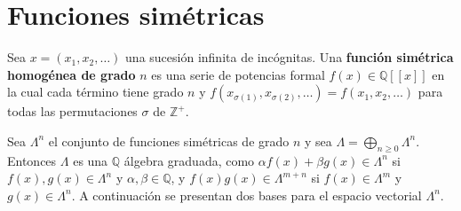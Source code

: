 \documentclass[12pt]{book}
\theoremstyle{definition}
\newcounter{in}
\newcounter{ini}
\begin{document}
\section{Funciones simétricas}
\label{sim_fun}

Sea $x = (x_1, x_2, \ldots)$ una sucesión infinita de incógnitas. Una
\textbf{función simétrica homogénea de grado} $n$ es una serie de
potencias formal
$f(x) \in \mathbb{Q}\left [ \left [ x \right ] \right ]$ en la cual
cada término tiene grado $n$ y
$f(x_{\sigma(1)},x_{\sigma(2)}, \ldots) = f(x_1, x_2, \ldots)$ para
todas las permutaciones $\sigma$ de $\mathbb{Z}^{+}$.

Sea $\Lambda^{n}$ el conjunto de funciones simétricas de grado $n$ y
sea $\Lambda = \bigoplus_{n \geq 0} \Lambda^{n}$. Entonces $\Lambda$
es una $\mathbb{Q}$ álgebra graduada, como
$\alpha f(x) + \beta g(x) \in \Lambda^{n}$ si
$f(x), g(x) \in \Lambda^{n}$ y $\alpha, \beta \in \mathbb{Q}$, y
$f(x)g(x) \in \Lambda^{m+n}$ si $f(x) \in \Lambda^{m}$ y
$g(x) \in \Lambda^{n}$.
A continuación se presentan dos bases para el espacio vectorial
$\Lambda^{n}$.  
\end{document}
